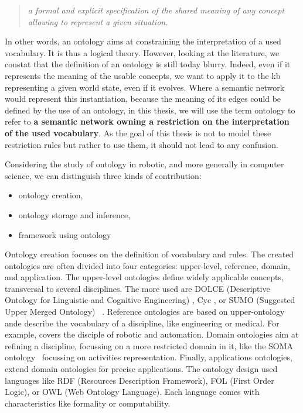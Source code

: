 \begin{quote} 
\centering 
\textit{a formal and explicit specification of the shared meaning of any concept allowing to represent a given situation.}
\end{quote}

In other words, an ontology aims at constraining the interpretation of a used vocabulary. It is thus a logical theory. However, looking at the literature, we constat that the definition of an ontology is still today blurry. Indeed, even if it represents the meaning of the usable concepts, we want to apply it to the \acrshort{kb} representing a given world state, even if it evolves. Where a semantic network would represent this instantiation, because the meaning of its edges could be defined by the use of an ontology, in this thesis, we will use the term ontology to refer to \textbf{a semantic network owning a restriction on the interpretation of the used vocabulary}. As the goal of this thesis is not to model these restriction rules but rather to use them, it should not lead to any confusion.

Considering the study of ontology in robotic, and more generally in computer science, we can distinguish three kinds of contribution:

\begin{itemize}
  \item ontology creation,
  \item ontology storage and inference,
  \item framework using ontology
\end{itemize}

Ontology creation focuses on the definition of vocabulary and rules. The created ontologies are often divided into four categories: upper-level, reference, domain, and application. The upper-level ontologies define widely applicable concepts, transversal to several disciplines. The more used are DOLCE (Descriptive Ontology for Linguistic and Cognitive Engineering) \cite{masolo_2003_dolce}, Cyc \cite{lenat_1989_building}, or SUMO (Suggested Upper Merged Ontology) ~\cite{niles_2001_towards}. Reference ontologies are based on upper-ontology ande describe the vocabulary of a discipline, like engineering or medical. For example, \cite{schlenoff_2015_ieee} covers the disciple of robotic and automation. Domain ontologies aim at refining a discipline, focussing on a more restricted domain in it, like the SOMA ontology~\cite{bessler_2020_foundations} focussing on activities representation. Finally, applications ontologies, extend domain ontologies for precise applications. The ontology design used languages like RDF (Resources Description Framework), FOL (First Order Logic), or OWL (Web Ontology Language). Each language comes with characteristics like formality or computability.


